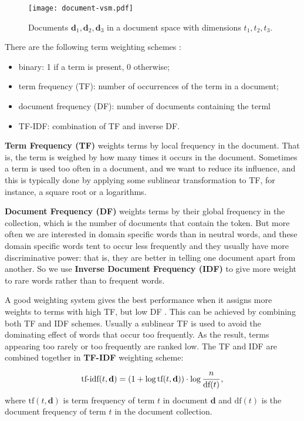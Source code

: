 \begin{figure}[h]
\centering\texttt{[image: document-vsm.pdf]}
\caption{Documents $\mathbf d_1, \mathbf d_2, \mathbf d_3$
in a document space with dimensions $t_1, t_2, t_3$.}
\label{fig:document-vsm}
\end{figure}


There are the following term weighting schemes \cite{manning2008introduction}:

\begin{itemize}
\itemsep1pt\parskip0pt
  \item binary: 1 if a term is present, 0 otherwise;
  \item term frequency (TF): number of occurrences of the term in a document;
  \item document frequency (DF): number of documents containing the terml
  \item TF-IDF: combination of TF and inverse DF.
\end{itemize}


\textbf{Term Frequency (TF)} weights terms by local frequency in the document.
That is, the term is weighed by how many times it occurs in the document.
Sometimes a term is used too often in a document, and we want to
reduce its influence, and this is typically done by applying some
sublinear transformation to TF, for instance, a square root or a logarithms.

\textbf{Document Frequency (DF)} weights terms by their global frequency
in the collection, which is the number of documents that contain the token.
But more often we are interested in domain specific words than in neutral words,
and these domain specific words tent to occur less frequently and they usually
have more discriminative power: that is, they are better in telling one document apart from another. So we use \textbf{Inverse Document Frequency (IDF)} to give more
weight to rare words rather than to frequent words.

A good weighting system gives the best performance when it assigns
more weights to terms with high TF, but low DF \cite{salton1988term}.
This can be achieved by combining both TF and IDF
schemes. Usually a sublinear TF is used to avoid the dominating effect of
words that occur too frequently. As the result, terms appearing
too rarely or too frequently are ranked low.
The TF and IDF are combined together in \textbf{TF-IDF} weighting scheme:
$$\text{tf-idf}(t, \mathbf d) = (1 + \log \text{tf}(t, \mathbf d)) \cdot \log \cfrac{n}{\text{df}(t)} \, ,$$
where $\text{tf}(t, \mathbf d)$ is term frequency of term $t$ in document
$\mathbf d$ and $\text{df}(t)$ is the document frequency of term $t$ in
the document collection.

